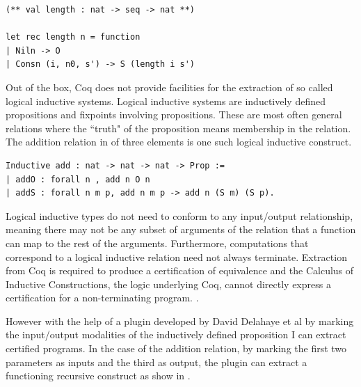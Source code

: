 \documentclass[12pt,twoside,notitlepage]{report}
\theoremstyle{plain}%
\theoremstyle{definition}
\theoremstyle{remark}
\begin{document}
\begin{minipage}{\linewidth}

\begin{lstlisting}[caption={Coq to OCaml extraction of length}]
(** val length : nat -> seq -> nat **)

let rec length n = function
| Niln -> O
| Consn (i, n0, s') -> S (length i s')
\end{lstlisting}

\end{minipage}


Out of the box, Coq does not provide facilities for the extraction of so called logical inductive systems. Logical inductive systems are inductively defined propositions and fixpoints involving propositions. These are most often general relations where the ``truth" of the proposition means membership in the relation. The addition relation in  of three elements is one such logical inductive construct.
\vspace{3mm}

\begin{minipage}{\linewidth}

\begin{lstlisting}[language={Coq},caption={Coq logical inductive example}, label={lst:coqlogindex}]
Inductive add : nat -> nat -> nat -> Prop :=
| addO : forall n , add n O n
| addS : forall n m p, add n m p -> add n (S m) (S p).
\end{lstlisting}

\end{minipage}

Logical inductive types do not need to conform to any input/output relationship, meaning there may not be any subset of arguments of the relation that a function can map to the rest of the arguments. Furthermore, computations that correspond to a logical inductive relation need not always terminate. Extraction from Coq is required to produce a certification of equivalence and the Calculus of Inductive Constructions, the logic underlying Coq, cannot directly express a certification for a non-terminating program. \label{sec:first_mention_logind}.

However with the help of a plugin developed by David Delahaye et al \cite{delahaye2007extracting,tollitte2012producing} by marking the input/output modalities of the inductively defined proposition I can extract certified programs. In the case of the addition relation, by marking the first two parameters as inputs and the third as output, the plugin can extract a functioning recursive construct as show in .\vspace{3mm}
\end{document}
